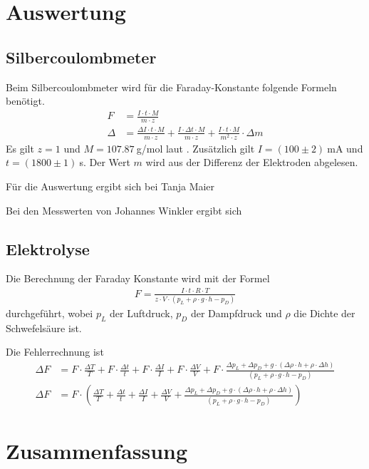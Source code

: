 \documentclass{article}
\begin{document}
\section{Auswertung}

\subsection{Silbercoulombmeter}
Beim Silbercoulombmeter wird für die Faraday-Konstante folgende Formeln benötigt.
\begin{align*}
F &= \frac{I\cdot t\cdot M}{m\cdot z} \\
\Delta &= \frac{\Delta I\cdot t\cdot M}{m\cdot z} + \frac{I\cdot \Delta t\cdot M}{m\cdot z} +\frac{I\cdot t\cdot M}{m^2\cdot z}\cdot \Delta m
\end{align*}
Es gilt $z=1$ und $M=107.87~$g/mol laut \cite{silber}. Zusätzlich gilt $I=(100 \pm 2)~$mA und $t=(1800 \pm 1)~$s. Der Wert $m$ wird aus der Differenz der Elektroden abgelesen.

Für die Auswertung ergibt sich bei Tanja Maier

Bei den Messwerten von Johannes Winkler ergibt sich




\subsection{Elektrolyse}


Die Berechnung der Faraday Konstante wird mit der Formel
\begin{align}
F = \frac{I\cdot t\cdot R \cdot T}{z \cdot V \cdot (p_L +\rho \cdot g \cdot h - p_D)}
\end{align}
durchgeführt, wobei $p_L$ der Luftdruck, $p_D$ der Dampfdruck und $\rho$ die Dichte der Schwefelsäure ist.

Die Fehlerrechnung ist
\begin{align*}
\Delta F &= F\cdot \frac{\Delta T}{T} + F\cdot \frac{\Delta t}{t} + F\cdot \frac{\Delta I}{I} + F \cdot \frac{\Delta V}{V}  + F\cdot \frac{\Delta p_L + \Delta p_D + g\cdot (\Delta\rho \cdot h + \rho\cdot \Delta h)}{(p_L +\rho \cdot g \cdot h - p_D)}\\
\Delta F &= F\cdot \left(\frac{\Delta T}{T} + \frac{\Delta t}{t} + \frac{\Delta I}{I} + \frac{\Delta V}{V}  + \frac{\Delta p_L + \Delta p_D + g\cdot (\Delta\rho \cdot h + \rho\cdot \Delta h)}{(p_L +\rho \cdot g \cdot h - p_D)}\right)
\end{align*}

\section{Zusammenfassung}
\end{document}
